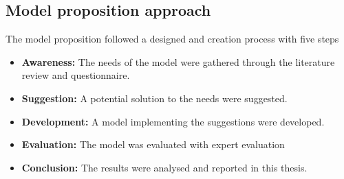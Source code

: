 \subsection{Model proposition approach}    
The model proposition followed a designed and creation process with five steps
\begin{itemize}
    \item \textbf{Awareness:} The needs of the model were gathered through the literature review and questionnaire.
    \item \textbf{Suggestion:} A potential solution to the needs were suggested.
    \item \textbf{Development:} A model implementing the suggestions were developed.
    \item \textbf{Evaluation:} The model was evaluated with expert evaluation
    \item \textbf{Conclusion:} The results were analysed and reported in this thesis.
\end{itemize}

